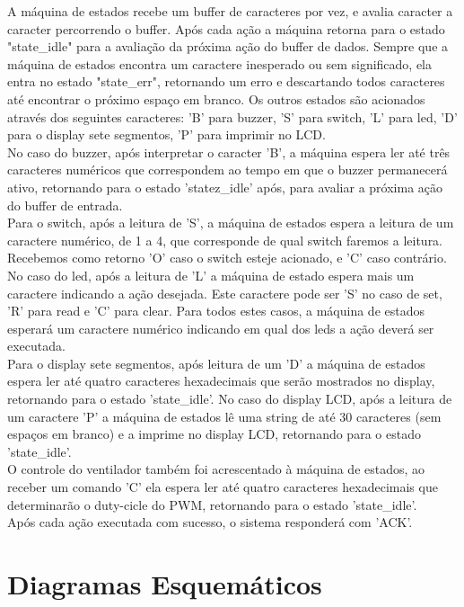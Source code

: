 \documentclass{article}
\begin{document}
A máquina de estados recebe um buffer de caracteres por vez, e avalia caracter a caracter percorrendo o buffer. Após cada ação a máquina retorna para o estado "state\_idle" para a avaliação da próxima ação do buffer de dados. Sempre que a máquina de estados encontra um caractere inesperado ou sem significado, ela entra no estado "state\_err", retornando um erro e descartando todos caracteres até encontrar o próximo espaço em branco. Os outros estados são acionados através dos seguintes caracteres: 'B' para buzzer, 'S' para switch, 'L' para led, 'D' para o display sete segmentos, 'P' para imprimir no LCD.\\
No caso do buzzer,  após interpretar o caracter 'B', a máquina espera ler até três caracteres numéricos que correspondem ao tempo em que o buzzer permanecerá ativo, retornando para o estado 'statez\_idle' após, para avaliar a próxima ação do buffer de entrada.\\
Para o switch, após a leitura de 'S', a máquina de estados espera a leitura de um caractere numérico, de 1 a 4, que corresponde de qual switch faremos a leitura. Recebemos como retorno 'O' caso o switch esteje acionado, e 'C' caso contrário.\\
No caso do led, após a leitura de 'L' a máquina de estado espera mais um caractere indicando a ação desejada. Este caractere pode ser 'S' no caso de set, 'R' para read e 'C' para clear. Para todos estes casos, a máquina de estados esperará um caractere numérico indicando em qual dos leds a ação deverá ser executada.\\
Para o display sete segmentos, após leitura de um 'D' a máquina de estados espera ler até quatro caracteres hexadecimais que serão mostrados no display, retornando para o estado 'state\_idle'.
No caso do display LCD, após a leitura de um caractere 'P' a máquina de estados lê uma string de até 30 caracteres (sem espaços em branco) e a imprime no display LCD, retornando para o estado 'state\_idle'.\\
O controle do ventilador também foi acrescentado à máquina de estados, ao receber um comando 'C' ela espera ler até quatro caracteres hexadecimais que determinarão o duty-cicle do PWM, retornando para o estado 'state\_idle'.\\
Após cada ação executada com sucesso, o sistema responderá com 'ACK'.

\section{Diagramas Esquemáticos}
\end{document}
